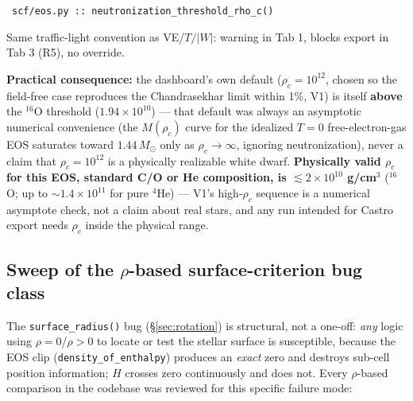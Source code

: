 \documentclass[11pt,a4paper]{scrartcl}
\newcommand{\arrowto}[1]{%
  \par\vspace{2pt}\noindent{\color{linkblue}$\rightarrow$}~\texttt{\small #1}\par\vspace{2pt}}
\newcommand{\code}[1]{\texttt{\small #1}}
\begin{document}
\arrowto{scf/eos.py :: neutronization\_threshold\_rho\_c()}

Same traffic-light convention as VE/$T/|W|$: warning in Tab 1, blocks
export in Tab 3 (R5), no override.

\textbf{Practical consequence:} the dashboard's own default
($\rho_c=10^{12}$, chosen so the field-free case reproduces the
Chandrasekhar limit within 1\%, V1) is itself \textbf{above} the
$^{16}$O threshold ($1.94\times10^{10}$) --- that default was always an
asymptotic numerical convenience (the $M(\rho_c)$ curve for the
idealized $T=0$ free-electron-gas EOS saturates toward $1.44\,M_\odot$
only as $\rho_c\to\infty$, ignoring neutronization), never a claim that
$\rho_c=10^{12}$ is a physically realizable white dwarf.
\textbf{Physically valid $\rho_c$ for this EOS, standard C/O or He
composition, is $\lesssim2\times10^{10}$ g/cm$^3$} ($^{16}$O; up to
$\sim1.4\times10^{11}$ for pure $^4$He) --- V1's high-$\rho_c$ sequence
is a numerical asymptote check, not a claim about real stars, and any
run intended for Castro export needs $\rho_c$ inside the physical range.

\subsection{\texorpdfstring{Sweep of the $\rho$-based surface-criterion bug class}{Sweep of the rho-based surface-criterion bug class}}
\label{sec:rho-bug-sweep}

The \code{surface\_radius()} bug (\S\ref{sec:rotation}) is
structural, not a one-off: \emph{any} logic using $\rho=0$/$\rho>0$ to
locate or test the stellar surface is susceptible, because the EOS clip
(\code{density\_of\_enthalpy}) produces an \emph{exact} zero and destroys
sub-cell position information; $H$ crosses zero continuously and does
not. Every $\rho$-based comparison in the codebase was reviewed for this
specific failure mode:
\end{document}
